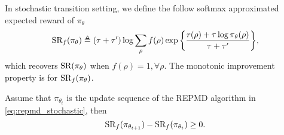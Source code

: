 In stochastic transition setting, we define the follow softmax approximated expected reward of $\pi_\theta$
\begin{equation*}
	\text{SR}_f(\pi_\theta) \triangleq (\tau + \tau^{\prime})\log{ \sum_{\rho}{ f(\rho) \exp\left\{ \frac{r(\rho) + \tau \log{\pi_\theta(\rho)} }{\tau + \tau^{\prime}} \right\} }},
\end{equation*}
which recovers $\text{SR}(\pi_\theta)$ when $f(\rho) = 1, \forall \rho$. The monotonic improvement property is for $\text{SR}_f(\pi_\theta)$.

\begin{thm}
\label{thm:monotonically_increasing_sr_property_stochastic}
Assume that $\pi_{\theta_{t}}$ is the update sequence of the REPMD algorithm in \cref{eq:repmd_stochastic}, then
\begin{equation*}
	\text{SR}_f(\pi_{\theta_{t+1}}) - \text{SR}_f(\pi_{\theta_t})\ge 0.
\end{equation*}
\end{thm}
